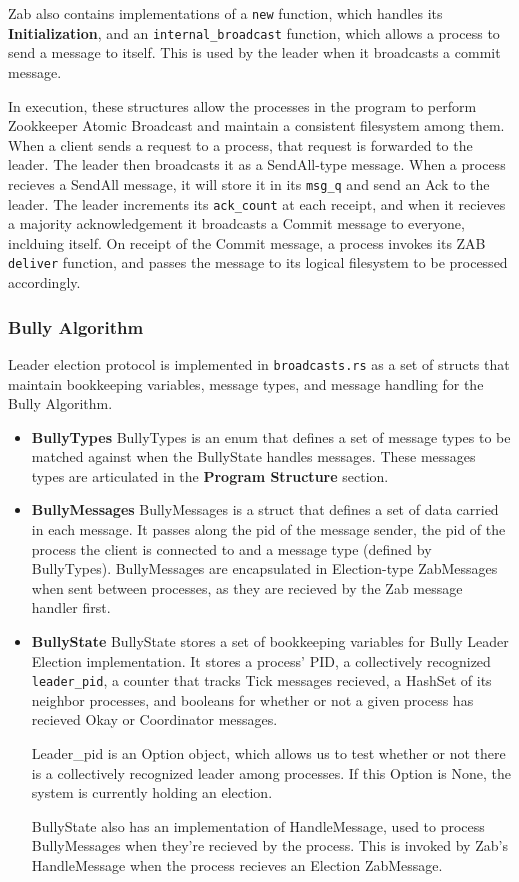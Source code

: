 \documentclass{article}
\begin{document}
    Zab also contains implementations of a \verb|new| function, which handles its \textbf{Initialization}, and an \verb|internal_broadcast| function, which allows a process to send a message to itself. This is used by the leader when it broadcasts a commit message.

    In execution, these structures allow the processes in the program to perform Zookkeeper Atomic Broadcast and maintain a consistent filesystem among them. When a client sends a request to a process, that request is forwarded to the leader. The leader then broadcasts it as a SendAll-type message. When a process recieves a SendAll message, it will store it in its \verb|msg_q| and send an Ack to the leader. The leader increments its \verb|ack_count| at each receipt, and when it recieves a majority acknowledgement it broadcasts a Commit message to everyone, inclduing itself. On receipt of the Commit message, a process invokes its ZAB \verb|deliver| function, and passes the message to its logical filesystem to be processed accordingly. 

    \subsubsection*{Bully Algorithm}
    Leader election protocol is implemented in \verb|broadcasts.rs| as a set of structs that maintain bookkeeping variables, message types, and message handling for the Bully Algorithm.

	\begin{itemize}
	    \item\textbf{BullyTypes}
	    BullyTypes is an enum that defines a set of message types to be matched against when the BullyState handles messages. These messages types are articulated in the \textbf{Program Structure} section. 
	    \item\textbf{BullyMessages}
	    BullyMessages is a struct that defines a set of data carried in each message. It passes along the pid of the message sender, the pid of the process the client is connected to and a message type (defined by BullyTypes). BullyMessages are encapsulated in Election-type ZabMessages when sent between processes, as they are recieved by the Zab message handler first. 
	    \item\textbf{BullyState}
	    BullyState stores a set of bookkeeping variables for Bully Leader Election implementation. It stores a process' PID, a collectively recognized \verb|leader_pid|, a counter that tracks Tick messages recieved, a HashSet of its neighbor processes, and booleans for whether or not a given process has recieved Okay or Coordinator messages. 

	    Leader\_pid is an Option object, which allows us to test whether or not there is a collectively recognized leader among processes. If this Option is None, the system is currently holding an election.

		BullyState also has an implementation of HandleMessage, used to process BullyMessages when they're recieved by the process. This is invoked by Zab's HandleMessage when the process recieves an Election ZabMessage. 
	\end{itemize}
\end{document}
